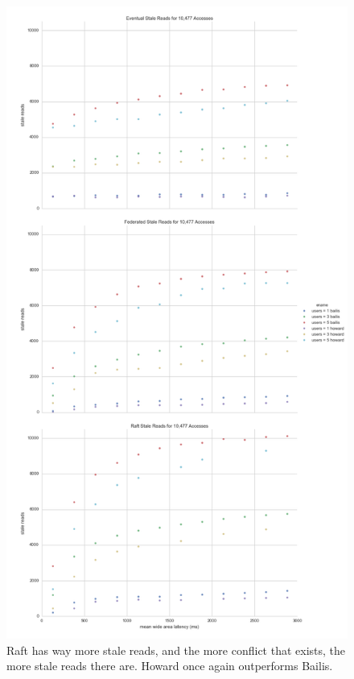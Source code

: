 \documentclass[10pt,letterpaper]{article}
\begin{document}
\begin{figure}[!h]
    \centering
        \includegraphics[height=0.9\textheight]{figures/stale_reads.png}
        \caption{\textsf{Raft has way more stale reads, and the more conflict that exists, the more stale reads there are. Howard once again outperforms Bailis.}}
        \label{fig:stale_reads}
\end{figure}
\end{document}
